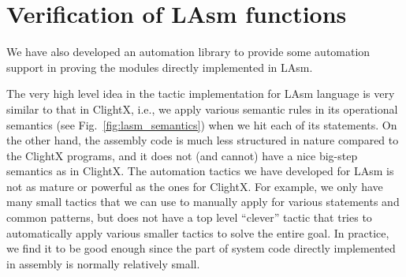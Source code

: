\section{Verification of LAsm functions}
We have also developed an automation library to provide some
automation support in proving the modules directly implemented in LAsm.

The very high level idea in the tactic implementation for LAsm language
is very similar to that in ClightX, i.e., we apply various semantic rules
in its operational semantics (see Fig.~\ref{fig:lasm_semantics}) when we
hit each of its statements.
On the other hand, the assembly code is much
less structured in nature compared to the ClightX programs, and it
does not (and cannot) have a nice big-step semantics as in ClightX.
The automation tactics we have developed for LAsm is not
as mature or powerful as the ones for ClightX. For example, we only
have many small tactics that we can use to manually apply for various
statements and common patterns, but does not have a top level ``clever''
tactic that tries to automatically apply various smaller tactics to
solve the entire goal. In practice, we find it to be good enough
since the part of system code directly implemented in assembly
is normally relatively small.